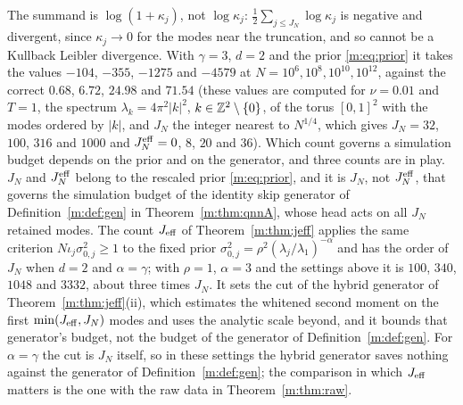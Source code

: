 \begin{remark}\label{m:rem:jeff}
The summand is $\log(1+\kappa_j)$, not $\log\kappa_j$: $\tfrac12\sum_{j\le J_N}\log\kappa_j$ is negative and divergent, since $\kappa_j\to0$ for the modes near the truncation, and so cannot be a Kullback Leibler divergence. With $\gamma=3$, $d=2$ and the prior \eqref{m:eq:prior} it takes the values $-104$, $-355$, $-1275$ and $-4579$ at $N=10^6,10^8,10^{10},10^{12}$, against the correct $0.68$, $6.72$, $24.98$ and $71.54$ (these values are computed for $\nu=0.01$ and $T=1$, the spectrum $\lambda_k=4\pi^2|k|^2$, $k\in\mathbb{Z}^2\setminus\{0\}$, of the torus $[0,1]^2$ with the modes ordered by $|k|$, and $J_N$ the integer nearest to $N^{1/4}$, which gives $J_N=32$, $100$, $316$ and $1000$ and $J^{\rm eff}_N=0$, $8$, $20$ and $36$). Which count governs a simulation budget depends on the prior and on the generator, and three counts are in play. $J_N$ and $J^{\rm eff}_N$ belong to the rescaled prior \eqref{m:eq:prior}, and it is $J_N$, not $J^{\rm eff}_N$, that governs the simulation budget of the identity skip generator of Definition~\ref{m:def:gen} in Theorem~\ref{m:thm:qnnA}, whose head acts on all $J_N$ retained modes. The count $J_{\rm eff}$ of Theorem~\ref{m:thm:jeff} applies the same criterion $N\iota_j\sigma^2_{0,j}\ge1$ to the fixed prior $\sigma^2_{0,j}=\rho^2(\lambda_j/\lambda_1)^{-\alpha}$ and has the order of $J_N$ when $d=2$ and $\alpha=\gamma$; with $\rho=1$, $\alpha=3$ and the settings above it is $100$, $340$, $1048$ and $3332$, about three times $J_N$. It sets the cut of the hybrid generator of Theorem~\ref{m:thm:jeff}(ii), which estimates the whitened second moment on the first $\min(J_{\rm eff},J_N)$ modes and uses the analytic scale beyond, and it bounds that generator's budget, not the budget of the generator of Definition~\ref{m:def:gen}. For $\alpha=\gamma$ the cut is $J_N$ itself, so in these settings the hybrid generator saves nothing against the generator of Definition~\ref{m:def:gen}; the comparison in which $J_{\rm eff}$ matters is the one with the raw data in Theorem~\ref{m:thm:raw}.
\end{remark}

